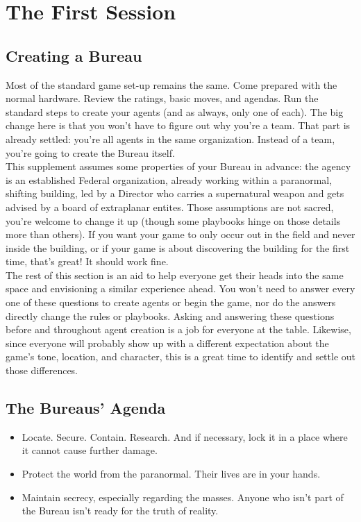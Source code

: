 \documentclass[10pt,oneside,landscape]{memoir}
\begin{document}
\chapter*{The First Session}
\begin{multicols}{2}
\section*{Creating a Bureau}
Most of the standard game set-up remains the same.  Come prepared with the normal hardware.  Review the ratings, basic moves, and agendas.  Run the standard steps to create your agents (and as always, only one of each).  The big change here is that you won't have to figure out why you're a team.  That part is already settled: you're all agents in the same organization.  Instead of a team, you're going to create the Bureau itself.
\\[4mm]
This supplement assumes some properties of your Bureau in advance: the agency is an established Federal organization, already working within a paranormal, shifting building, led by a Director who carries a supernatural weapon and gets advised by a board of extraplanar entites.  Those assumptions are not sacred, you're welcome to change it up (though some playbooks hinge on those details more than others).  If you want your game to only occur out in the field and never inside the building, or if your game is about discovering the building for the first time, that's great!  It should work fine.
\\[4mm]
The rest of this section is an aid to help everyone get their heads into the same space and envisioning a similar experience ahead.  You won't need to answer every one of these questions to create agents or begin the game, nor do the answers directly change the rules or playbooks.  Asking and answering these questions before and throughout agent creation is a job for everyone at the table.  Likewise, since everyone will probably show up with a different expectation about the game's tone, location, and character, this is a great time to identify and settle out those differences.
%
\begin{tcolorbox}[bottom=8mm,after skip=8mm]
\section*{The Bureaus' Agenda}
\begin{itemize}[parsep=4mm]

\item Locate.  Secure.  Contain.  Research.  And if necessary, lock it in a place where it cannot cause further damage.
\item Protect the world from the paranormal.  Their lives are in your hands.
\item Maintain secrecy, especially regarding the masses.  Anyone who isn't part of the Bureau isn't ready for the truth of reality.


\end{itemize}
\end{tcolorbox}
\end{multicols}
\end{document}
